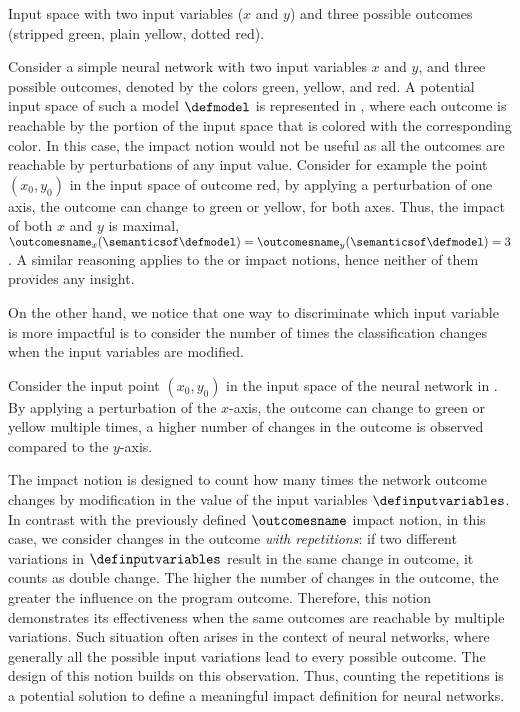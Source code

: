 \begin{example}
\begin{marginfigure}
    \caption{Input space with two input variables ($x$ and $y$) and three possible outcomes (stripped green, plain yellow, dotted red).
    }
    \label{fig:irregular}
  \end{marginfigure}
  Consider a simple neural network with two input variables $x$ and $y$, and three possible outcomes, denoted by the colors green, yellow, and red.
  A potential input space of such a model $\defmodel$ is represented in , where each outcome is reachable by the portion of the input space that is colored with the corresponding color.
  In this case, the \outcomesname{} impact notion would not be useful as all the outcomes are reachable by perturbations of any input value. Consider for example the point $(x_0, y_0)$ in the input space of outcome red, by applying a perturbation of one axis, the outcome can change to green or yellow, for both axes. Thus, the impact of both $x$ and $y$ is maximal, \cf{} $\outcomesname_x(\semanticsof\defmodel) = \outcomesname_y(\semanticsof\defmodel) = 3$.
  A similar reasoning applies to the \rangename{} or \qusedname{} impact notions, hence neither of them provides any insight.
\end{example}

On the other hand, we notice that one way to discriminate which input variable is more impactful is to consider the number of times the classification changes when the input variables are modified.

\begin{example}
  Consider the input point $(x_0, y_0)$ in the input space of the neural network in .
  By applying a perturbation of the $x$-axis, the outcome can change to green or yellow multiple times, a higher number of changes in the outcome is observed compared to the $y$-axis.
\end{example}


The \changesname{} impact notion is designed to count how many times the network outcome changes by modification in the value of the input variables $\definputvariables$.
In contrast with the previously defined $\outcomesname$ impact notion, in this case, we consider changes in the outcome \emph{with repetitions}: if two different variations in $\definputvariables$ result in the same change in outcome, it counts as double change.
The higher the number of changes in the outcome, the greater the influence on the program outcome.
Therefore, this notion demonstrates its effectiveness when the same outcomes are reachable by multiple variations.
Such situation often arises in the context of neural networks, where generally all the possible input variations lead to every possible outcome.
The design of this notion builds on this observation.
Thus, counting the repetitions is a potential solution to define a meaningful impact definition for neural networks.

